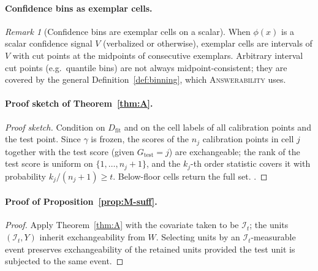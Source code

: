 \documentclass[11pt]{article}
\theoremstyle{definition}
\theoremstyle{remark}
\newtheorem{remark}[theorem]{Remark}
\newcommand{\Dfit}{D_{\mathrm{fit}}}
\newcommand{\Info}{\mathcal{I}}
\newcommand{\1}{\mathbf{1}}
\newcommand{\expname}[1]{\textsc{#1}}
\begin{document}
\paragraph{Confidence bins as exemplar cells.}
\begin{remark}[Confidence bins are exemplar cells on a scalar]
When $\phi(x)$ is a scalar confidence signal $V$ (verbalized or otherwise), exemplar cells
are intervals of $V$ with cut points at the midpoints of consecutive exemplars. Arbitrary
interval cut points (e.g.\ quantile bins) are not always midpoint-consistent; they are
covered by the general Definition~\ref{def:binning}, which \expname{Answerability} uses.
\end{remark}

\paragraph{Proof sketch of Theorem~\ref{thm:A}.}
\begin{proof}[Proof sketch]
Condition on $\Dfit$ and on the cell labels of all calibration points and the test
point. Since $\gamma$ is frozen, the scores of the $n_j$ calibration points in cell $j$
together with the test score (given $G_{\mathrm{test}}=j$) are exchangeable; the rank of the
test score is uniform on $\{1,\dots,n_j+1\}$, and the $k_j$-th order statistic covers it
with probability $k_j/(n_j+1)\ge t$. Below-floor cells return the full set.
\citep{vovk2005algorithmic,vovk2012conditional}.
\end{proof}

\paragraph{Proof of Proposition~\ref{prop:M-suff}.}
\begin{proof}
Apply Theorem~\ref{thm:A} with the covariate taken to be $\Info_t$; the units
$(\Info_t, Y)$ inherit exchangeability from $W$. Selecting units by an
$\Info_t$-measurable event preserves exchangeability of the retained units provided the
test unit is subjected to the same event.
\end{proof}
\end{document}
